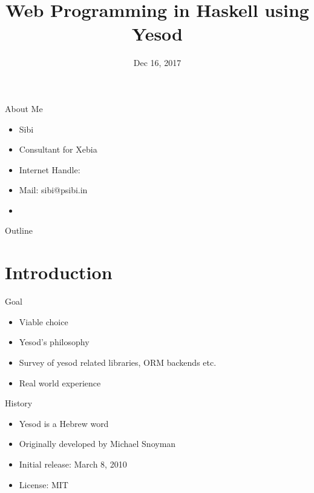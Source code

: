 \documentclass{beamer}
\title[Web programming in Haskell using Yesod] %
{Web Programming in Haskell using Yesod }
\author[Sibi Prabakaran] %
{}
\institute[Bangalore Haskell User Group Meetup] %
{
  Bangalore Haskell User Group Meetup \\
  Xebia India
}
\date[] %
{Dec 16, 2017}
\begin{document}
\begin{frame}
  \titlepage
\end{frame}

\begin{frame}{About Me}
\begin{itemize}
\item
Sibi
\item
Consultant for Xebia
\item
Internet Handle: \href{http://psibi.in/about.html}{}
\item
  Mail: sibi@psibi.in
\item \href{http://psibi.in}{}
\end{itemize}
\end{frame}

\begin{frame}{Outline}
  \tableofcontents
\end{frame}




\section{Introduction}

\begin{frame}{Goal}
\begin{itemize}

\item Viable choice
\item Yesod's philosophy
\item Survey of yesod related libraries, ORM backends etc.
\item Real world experience

\end{itemize}
\end{frame}

\begin{frame}{History}
  \begin{itemize}
  \item Yesod is a Hebrew word
  \item Originally developed by Michael Snoyman
  \item Initial release: March 8, 2010
  \item License: MIT
  \end{itemize}
\end{frame}
\end{document}
